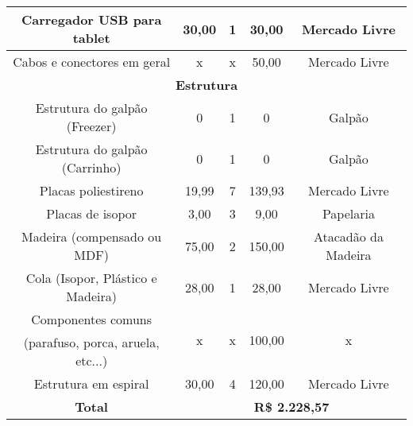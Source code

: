 \begin{longtable}{|c|c|c|c|c|}
\hline 
Carregador USB para tablet & 30,00 & 1 & 30,00 & Mercado Livre\tabularnewline
\hline 
Cabos e conectores em geral & x & x & 50,00 & Mercado Livre\tabularnewline
\hline 
\multicolumn{5}{|c|}{\textbf{Estrutura}}\tabularnewline
\hline 
Estrutura do galpão (Freezer) & 0 & 1 & 0 & Galpão\tabularnewline
\hline 
Estrutura do galpão (Carrinho) & 0 & 1 & 0 & Galpão\tabularnewline
\hline 
Placas poliestireno & 19,99 & 7 & 139,93 & Mercado Livre\tabularnewline
\hline 
Placas de isopor & 3,00 & 3 & 9,00 & Papelaria\tabularnewline
\hline 
Madeira (compensado ou MDF) & 75,00 & 2 & 150,00 & Atacadão da Madeira\tabularnewline
\hline 
Cola (Isopor, Plástico e Madeira) & 28,00 & 1 & 28,00 & Mercado Livre\tabularnewline
\hline 
Componentes comuns  & \multirow{2}{*}{x} & \multirow{2}{*}{x} & \multirow{2}{*}{100,00} & \multirow{2}{*}{x}\tabularnewline
(parafuso, porca, aruela, etc...) &  &  &  & \tabularnewline
\hline 
Estrutura em espiral & 30,00 & 4 & 120,00 & Mercado Livre\tabularnewline
\hline 
\textbf{Total} & \multicolumn{4}{c|}{\textbf{R\$ 2.228,57}}\tabularnewline
\hline 
\end{longtable}
